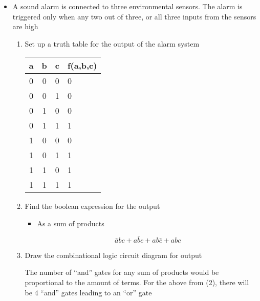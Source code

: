 \begin{itemize}
    \begin{itemize}

      \item A sound alarm is connected to three environmental sensors. The alarm is triggered only when any two out of three, or all three inputs from the sensors are high

        \begin{enumerate}

          \item Set up a truth table for the output of the alarm system

            \vspace{10pt}

            \begin{center}
              \begin{tabular}[h!]{c c c | l}
                a & b & c & f(a,b,c)\\
                \hline
                0 & 0 & 0 & 0\\
                0 & 0 & 1 & 0\\
                0 & 1 & 0 & 0\\
                0 & 1 & 1 & 1\\
                1 & 0 & 0 & 0\\
                1 & 0 & 1 & 1\\
                1 & 1 & 0 & 1\\
                1 & 1 & 1 & 1\\
                \hline
              \end{tabular}
            \end{center}

            \vspace{10pt}

          \item Find the boolean expression for the output

            \begin{itemize}

              \item As a sum of products

                $$\bar{a}bc+a\bar{b}c+ab\bar{c}+abc$$

            \end{itemize}

          \item Draw the combinational logic circuit diagram for output

            The number of ``and'' gates for any sum of products would be proportional to the amount of terms. For the above from (2), there will be 4 ``and'' gates leading to an ``or'' gate


\end{enumerate}
\end{itemize}
\end{itemize}
